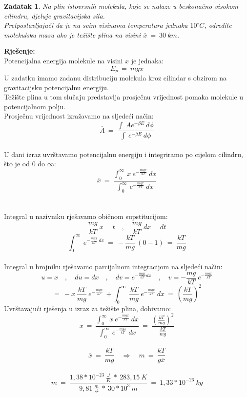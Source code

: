 \documentclass[a4paper,12pt]{article}
\newtheorem{ZDK}{Zadatak}[section]
\begin{document}
\newpage
\begin{ZDK}
		Na plin istovrsnih molekula, koje se nalaze u beskona\v{c}no visokom cilindru, djeluje gravitacijska sila. \\
		Pretpostavljaju\'ci da je na svim visinama temperatura jednaka $10^{\circ}C$, odredite molekulsku masu ako je te\v{z}i\v{s}te plina na visini 
		$\overline{x}\ =\ 30\ km$.
\end{ZDK}
\textbf{Rje\v{s}enje:} \\
\newline
Potencijalna energija molekule na visini $x$ je jednaka:
$$ E_p\ =\ mgx $$ 
U zadatku imamo zadanu distribuciju molekula kroz cilindar s obzirom na gravitacijsku potencijalnu energiju. \\
Te\v{z}i\v{s}te plina u tom slu\v{c}aju predstavlja prosje\v{c}nu vrijednost pomaka molekule u potencijalnom polju. \\
Prosje\v{c}nu vrijednost izra\v{z}avamo na sljede\'ci na\v{c}in: \\
$$ \overline{A}\ =\ \frac{\int\ Ae^{-\beta E}\ d\phi}{\int\ e^{-\beta E}\ d\phi} $$
\\
U dani izraz uvr\v{s}tavamo potencijalnu energiju i integriramo po cijelom cilindru, \v{s}to je od $0$ do $\infty$:
$$ \overline{x}\ =\ \frac{\int_{0}^{\infty}\ x\ e^{-\frac{mgx}{kT}}\ dx}{\int_{0}^{\infty}\ e^{-\frac{mgx}{kT}}\ dx} $$
\\
\\
Integral u nazivniku rje\v{s}avamo obi\v{c}nom supstitucijom:
$$ \frac{mg}{kT}\ x=t \quad,\quad \frac{mg}{kT}\ dx=dt $$
$$ \int_{0}^{\infty}\ e^{-\frac{mgx}{kT}\ dx}\ =\ -\frac{kT}{mg}\ (0-1)\ =\ \frac{kT}{mg} $$
\\
Integral u brojniku rje\v{s}avamo parcijalnom integracijom na sljede\'ci na\v{c}in: 
$$ u=x \quad,\quad du=dx \quad,\quad dv=e^{-\frac{mgx}{kT}dx} \quad,\quad v=-\frac{mg}{kT}\ e^{-\frac{mgx}{kT}} $$
$$ =\ -x\ \frac{kT}{mg}\ e^{-\frac{mgx}{kT}}\ +\int_{0}^{\infty}\ \frac{kT}{mg}\ e^{-\frac{mgx}{kT}}\ dx\ =\ \left( \frac{kT}{mg}  \right)^2 $$
\newpage
Uvr\v{s}tavaju\'ci rje\v{s}enja u izraz za te\v{z}i\v{s}te plina, dobivamo:
\\
$$ \overline{x}\ =\ \frac{\int_{0}^{\infty}\ x\ e^{-\frac{mgx}{kT}}\ dx}{\int_{0}^{\infty}\ e^{-\frac{mgx}{kT}}\ dx}\ =\ \frac{\left( \frac{kT}{mg} \right)^2}{\frac{kT}{mg}} $$
\\
$$ \overline{x}\ =\ \frac{kT}{mg} \quad \Rightarrow \quad m\ =\ \frac{kT}{g\overline{x}} $$
\\
$$ m\ =\ \frac{1,38*10^{-23}\ \frac{J}{K}\ *\ 283,15\ K}{9,81\ \frac{m}{s^2}\ *\ 30*10^3\ m}\ =\ 1,33*10^{-26}\ kg $$
\end{document}
